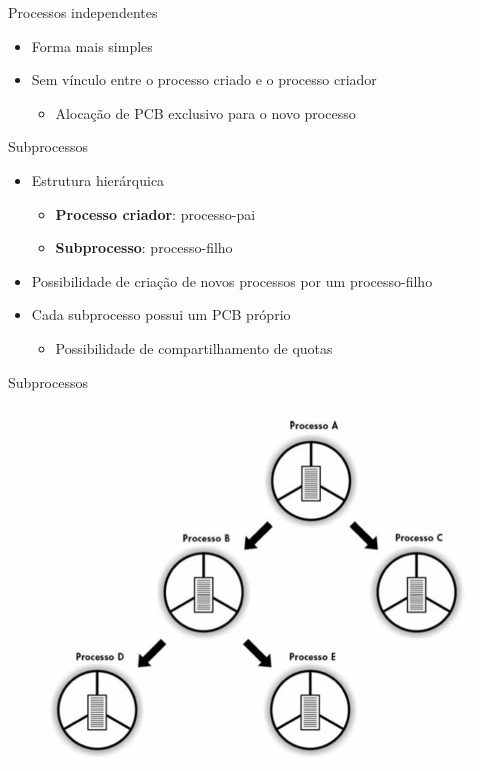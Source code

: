 \documentclass[aspectratio=169,
				xcolor=table]{beamer}
\begin{document}
	\begin{frame}{Processos independentes}
		\begin{itemize}
			\item Forma mais simples
			\vspace{1em}
			\item Sem vínculo entre o processo criado e o processo criador
			\begin{itemize}
				\item Alocação de PCB exclusivo para o novo processo
			\end{itemize}
		\end{itemize}		
	\end{frame}
	
	\begin{frame}{Subprocessos}
		\begin{itemize}
			\item Estrutura hierárquica
			\begin{itemize}
				\item \textbf{Processo criador}: processo-pai
				\item \textbf{Subprocesso}: processo-filho
			\end{itemize}
			\vspace{1em}
			\item Possibilidade de criação de novos processos por um processo-filho
			\vspace{1em}
			\item Cada subprocesso possui um PCB próprio
			\begin{itemize}
				\item Possibilidade de compartilhamento de quotas
			\end{itemize}
		\end{itemize}		
	\end{frame}
	
	\begin{frame}{Subprocessos}		
		\begin{figure}[hbtp]
			\centering
			\includegraphics[keepaspectratio, height=.8\textheight]{../figs/cap04/subprocessos.png}
		\end{figure}
	\end{frame}
	
\end{document}
